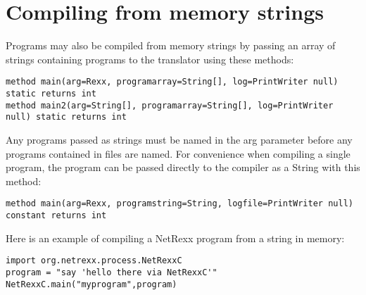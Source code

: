 \section{Compiling from memory strings}
Programs may also be compiled from memory strings by passing an array
of strings containing programs to the translator using these methods:
\small
\begin{verbatim}
method main(arg=Rexx, programarray=String[], log=PrintWriter null) static returns int
method main2(arg=String[], programarray=String[], log=PrintWriter
null) static returns int
\end{verbatim}
\large
Any programs passed as strings must be named in the arg parameter before any programs contained in files are named.
For convenience when compiling a single program, the program can be
passed directly to the compiler as a String with this method:
\small
\begin{verbatim}
method main(arg=Rexx, programstring=String, logfile=PrintWriter null)
constant returns int
\end{verbatim}
\large
Here is an example of compiling a NetRexx program from a string in
memory:
\small
\begin{verbatim}
import org.netrexx.process.NetRexxC
program = "say 'hello there via NetRexxC'"
NetRexxC.main("myprogram",program)
\end{verbatim}
\large